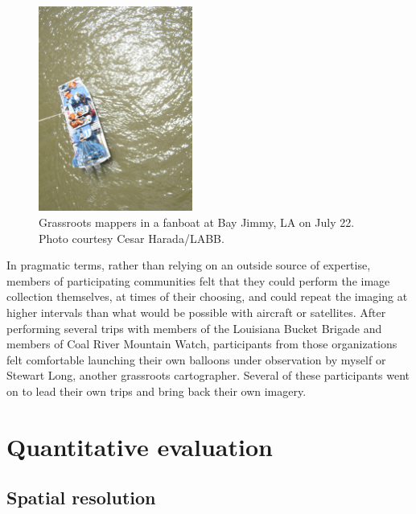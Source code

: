 \documentclass[11pt,oneside,notitlepage]{report}
\begin{document}
{{\begin{figure}
	\begin{flushright}
		\includegraphics[width=0.45\textwidth]{images/labb-bay-jimmy.jpg}
		\caption{Grassroots mappers in a fanboat at Bay Jimmy, LA on July 22. Photo courtesy Cesar Harada/LABB.}
	\end{flushright}
\end{figure}

In pragmatic terms, rather than relying on an outside source of expertise, members of participating communities felt that they could perform the image collection themselves, at times of their choosing, and could repeat the imaging at higher intervals than what would be possible with aircraft or satellites. After performing several trips with members of the Louisiana Bucket Brigade and members of Coal River Mountain Watch, participants from those organizations felt comfortable launching their own balloons under observation by myself or Stewart Long, another grassroots cartographer. Several of these participants went on to lead their own trips and bring back their own imagery.

\section{Quantitative evaluation}


\subsection{Spatial resolution}

}}
\end{document}
